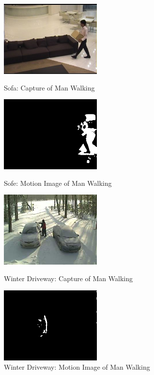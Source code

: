\documentclass[journal]{IEEEtran}
\begin{document}
\begin{figure}[ht]
    \centering
    \begin{minipage}{0.4\textwidth}
    \centering
    \includegraphics[width=2in]{in000113.jpg}
    \caption{Sofa: Capture of Man Walking}
    \label{fig:man_capture}
    \end{minipage}

    \begin{minipage}{0.4\textwidth}
    \centering
    \includegraphics[width=2in]{bin000113.png}
    \caption{Sofe: Motion Image of Man Walking}
    \label{fig:man_motion}
    \end{minipage}
    
    \centering
    \begin{minipage}{0.4\textwidth}
    \centering
    \includegraphics[width=2in]{in000554.jpg}
    \caption{Winter Driveway: Capture of Man Walking}
    \label{fig:snow_man_capture}
    \end{minipage}

    \begin{minipage}{0.4\textwidth}
    \centering
    \includegraphics[width=2in]{bin000554.png}
    \caption{Winter Driveway: Motion Image of Man Walking}
    \label{fig:snow_man_motion}
    \end{minipage}
\end{figure}
\end{document}

